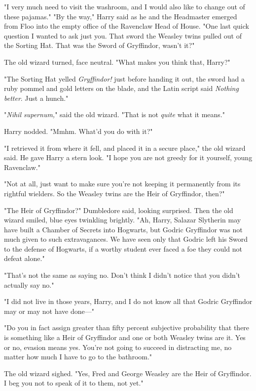 "I very much need to visit the washroom, and I would also like to change out of
these pajamas."
\sbreak
"By the way," Harry said as he and the Headmaster emerged from Floo into the
empty office of the Ravenclaw Head of House. "One last quick question I wanted
to ask just you. That sword the Weasley twins pulled out of the Sorting Hat.
That was the Sword of Gryffindor, wasn't it?"

The old wizard turned, face neutral. "What makes you think that, Harry?"

"The Sorting Hat yelled \emph{Gryffindor!} just before handing it out, the
sword had a ruby pommel and gold letters on the blade, and the Latin script
said \emph{Nothing better}. Just a hunch."

"\emph{Nihil supernum,}" said the old wizard. "That is not \emph{quite} what it
means."

Harry nodded. "Mmhm. What'd you do with it?"

"I retrieved it from where it fell, and placed it in a secure place," the old
wizard said. He gave Harry a stern look. "I hope you are not greedy for it
yourself, young Ravenclaw."

"Not at all, just want to make sure you're not keeping it permanently from its
rightful wielders. So the Weasley twins are the Heir of Gryffindor, then?"

"The Heir of Gryffindor?" Dumbledore said, looking surprised. Then the old
wizard smiled, blue eyes twinkling brightly. "Ah, Harry, Salazar Slytherin may
have built a Chamber of Secrets into Hogwarts, but Godric Gryffindor was not
much given to such extravagances. We have seen only that Godric left his Sword
to the defense of Hogwarts, if a worthy student ever faced a foe they could not
defeat alone."

"That's not the same as saying no. Don't think I didn't notice that you didn't
actually say no."

"I did not live in those years, Harry, and I do not know all that Godric
Gryffindor may or may not have done\mbox{---}"

"Do you in fact assign greater than fifty percent subjective probability that
there is something like a Heir of Gryffindor and one or both Weasley twins are
it. Yes or no, evasion means yes. You're not going to succeed in distracting
me, no matter how much I have to go to the bathroom."

The old wizard sighed. "Yes, Fred and George Weasley are the Heir of
Gryffindor. I beg you not to speak of it to them, not yet."

